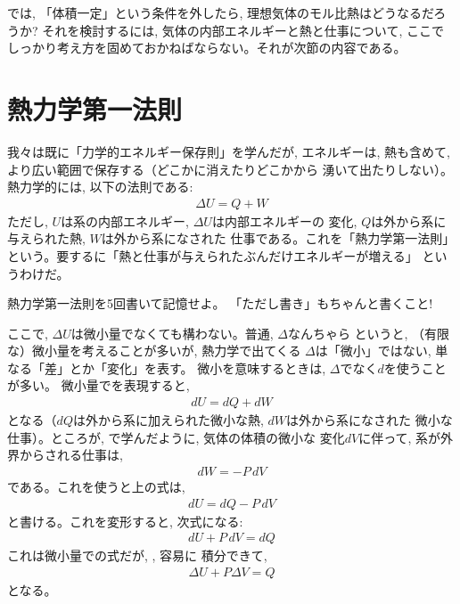 では, 「体積一定」という条件を外したら, 理想気体のモル比熱はどうなるだろうか?
それを検討するには, 気体の内部エネルギーと熱と仕事について, ここで
しっかり考え方を固めておかねばならない。それが次節の内容である。\\



\section{熱力学第一法則}

我々は既に「力学的エネルギー保存則」を学んだが, エネルギーは, 
熱も含めて, より広い範囲で保存する（どこかに消えたりどこかから
湧いて出たりしない）。熱力学的には, 以下の法則である:
\begin{eqnarray}
\Delta U=Q+W\label{eq:thermlaw1}
\end{eqnarray}
ただし, $U$は系の内部エネルギー, $\Delta U$は内部エネルギーの
変化, $Q$は外から系に与えられた熱, $W$は外から系になされた
仕事である。これを「熱力学第一法則」
という。要するに「熱と仕事が与えられたぶんだけエネルギーが増える」
というわけだ。

\begin{q}\label{q:themlaw1} 熱力学第一法則を5回書いて記憶せよ。
「ただし書き」もちゃんと書くこと!\end{q}\mv

ここで, $\Delta U$は微小量でなくても構わない。普通, $\Delta$なんちゃら
というと, （有限な）微小量を考えることが多いが, 熱力学で出てくる
$\Delta$は「微小」ではない, 単なる「差」とか「変化」を表す。
微小を意味するときは, $\Delta$でなく$d$を使うことが多い。
微小量でを表現すると, 
\begin{eqnarray}
dU=dQ+dW\label{eq:thermlaw1inf}
\end{eqnarray}
となる（$dQ$は外から系に加えられた微小な熱, $dW$は外から系になされた
微小な仕事）。ところが, で学んだように, 気体の体積の微小な
変化$dV$に伴って, 系が外界からされる仕事は, 
\begin{eqnarray}dW=-P\,dV\end{eqnarray}
である。これを使うと上の式は, 
\begin{eqnarray}
dU=dQ-P\,dV\label{/eq:thermlaw1infPdV}
\end{eqnarray}
と書ける。これを変形すると, 次式になる: 
\begin{eqnarray}
dU+P\,dV=dQ\label{eq:thermlaw1infPdV2}
\end{eqnarray}
これは微小量での式だが, , 容易に
積分できて, 
\begin{eqnarray}
\Delta U+P\Delta V=Q\label{eq:thermlaw1infPdV3}
\end{eqnarray}
となる。


